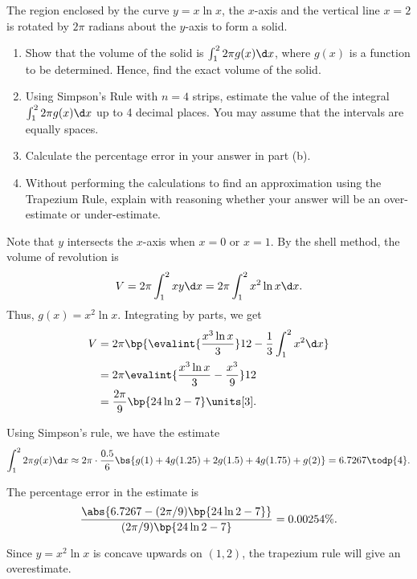 \begin{problem}
    The region enclosed by the curve $y = x \ln x$, the $x$-axis and the vertical line $x = 2$ is rotated by $2\pi$ radians about the $y$-axis to form a solid.

    \begin{enumerate}
        \item Show that the volume of the solid is $\int_1^2 2\pi g(x) \d x$, where $g(x)$ is a function to be determined. Hence, find the exact volume of the solid.
        \item Using Simpson's Rule with $n = 4$ strips, estimate the value of the integral $\int_1^2 2\pi g(x) \d x$ up to 4 decimal places. You may assume that the intervals are equally spaces.
        \item Calculate the percentage error in your answer in part (b).
        \item Without performing the calculations to find an approximation using the Trapezium Rule, explain with reasoning whether your answer will be an over-estimate or under-estimate.
    \end{enumerate}
\end{problem}
\begin{solution}
    \begin{ppart}
        Note that $y$ intersects the $x$-axis when $x = 0$ or $x = 1$. By the shell method, the volume of revolution is \[V = 2\pi \int_1^2 xy \d x = 2\pi \int_1^2 x^2 \ln x \d x.\] Thus, $g(x) = x^2 \ln x$. Integrating by parts, we get
        \begin{align*}
            V &= 2\pi \bp{\evalint{\frac{x^3 \ln x}{3}}12 - \frac{1}{3} \int_1^2 x^2 \d x}\\
            &= 2\pi \evalint{\frac{x^3 \ln x}{3} - \frac{x^3}{9}}12\\
            &= \frac{2\pi}{9} \bp{24 \ln 2 - 7} \units[3].
        \end{align*}
    \end{ppart}
    \begin{ppart}
        Using Simpson's rule, we have the estimate \[\int_1^2 2\pi g(x) \d x \approx 2\pi \cdot \frac{0.5}{6} \bs{g(1) + 4g(1.25) + 2g(1.5) + 4g(1.75) + g(2)} = 6.7267 \todp{4}.\]
    \end{ppart}
    \begin{ppart}
        The percentage error in the estimate is \[\frac{\abs{6.7267 - (2\pi/9) \bp{24 \ln 2 - 7}}}{(2\pi/9) \bp{24 \ln 2 - 7}} = 0.00254\%.\]
    \end{ppart}
    \begin{ppart}
        Since $y = x^2 \ln x$ is concave upwards on $(1, 2)$, the trapezium rule will give an overestimate.
    \end{ppart}
\end{solution}

